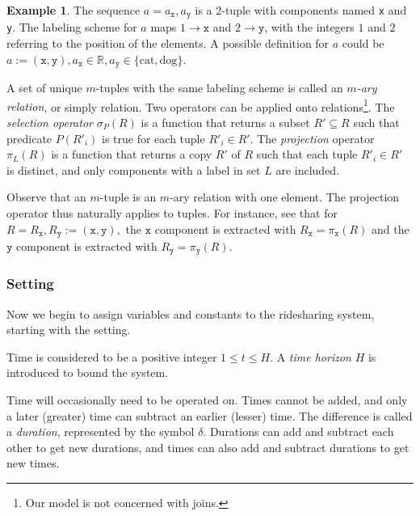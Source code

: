 \documentclass{article}
\newcommand{\hi}[1]{\noindent {\bf #1}}
\theoremstyle{definition}
\newtheorem{example}{Example}
\begin{document}
\begin{example}
\label{ex:tuple}
The sequence $a=a_\texttt{x},a_\texttt{y}$
is a 2-tuple with components named \texttt{x} and \texttt{y}.
The labeling
scheme for $a$ maps $1\rightarrow \texttt{x}$ and $2\rightarrow \texttt{y}$, with the
integers $1$ and $2$ referring to the position of the elements. A possible definition for
$a$ could be $a:=(\texttt{x},\texttt{y}),
a_\texttt{x}\in\mathbb{R}, a_\texttt{y}\in\{\textrm{cat},\textrm{dog}\}.$
\end{example}

A set of unique $m$-tuples with the same labeling scheme is called
an \emph{$m$-ary relation}, or simply relation.
Two operators can be applied onto relations\footnote{Our model is not concerned with joins.}.
The \emph{selection operator} $\sigma_P(R)$ is a function that returns a subset
$R'\subseteq R$ such that predicate $P(R'_i)$ is true for each tuple $R'_i\in R'$.
The \emph{projection} operator $\pi_L(R)$ is a function that returns a copy
$R'$ of $R$ such that each tuple $R'_i\in R'$ is distinct, and only components
with a label in set $L$ are included.

Observe that an $m$-tuple is an $m$-ary relation with one element.
The projection operator thus naturally applies to tuples. For instance, see that for
$R=R_\texttt{x},R_\texttt{y}:=(\texttt{x},\texttt{y}),$
the $\texttt{x}$ component is extracted with
$R_\texttt{x}=\pi_\texttt{x}(R)$
and the $\texttt{y}$ component is extracted with
$R_\texttt{y}=\pi_\texttt{y}(R)$.

\subsubsection{Setting}
\label{sec:setting}
Now we begin to assign variables and constants to the ridesharing
system, starting with the setting.

\hi{Time.} Time is considered to be a positive integer $1\leq t\leq H$.  A
\emph{time horizon} $H$ is introduced to bound the system.

Time will occasionally need to be operated on.  Times cannot be added, and only
a later (greater) time can subtract an earlier (lesser) time.  The difference
is called a \emph{duration}, represented by the symbol $\delta$.  Durations can
add and subtract each other to get new durations, and times can also add and
subtract durations to get new times.
\end{document}
